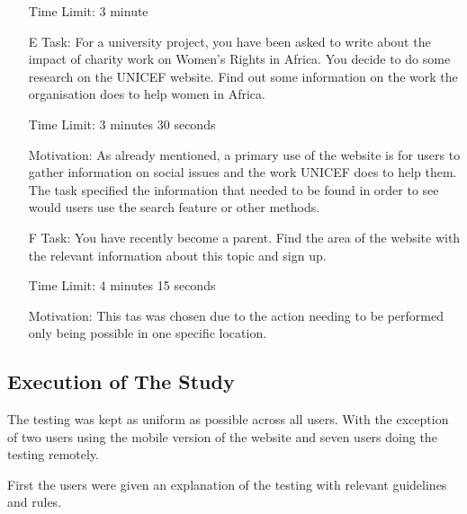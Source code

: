 \begin{itemize}
    \item [] Time Limit: 3 minute

    \item[E] Task: For a university project, you have been asked to write about the impact of charity work on Women’s Rights in Africa. You decide to do some research on the UNICEF website.
    Find out some information on the work the organisation does to help women in Africa. 
  
    \item [] Time Limit: 3 minutes 30 seconds
  
    \item[] Motivation: As already mentioned, a primary use of the website is for users to gather information on social issues and the work UNICEF does to help them. The task specified the information that needed to be found in order to see would users use the search feature or other methods. 

    \item[F] Task: You have recently become a parent. Find the area of the website with the relevant information about this topic and sign up.
    
    \item [] Time Limit: 4 minutes 15 seconds

    \item[] Motivation: This tas was chosen due to the action needing to be performed only being possible in one specific location. 
    
\end{itemize}

\subsection{Execution of The Study}

The testing was kept as uniform as possible across all users. With the exception of two users using the mobile version of the website and seven users doing the testing remotely. 

First the users were given an explanation of the testing with relevant guidelines and rules.  

